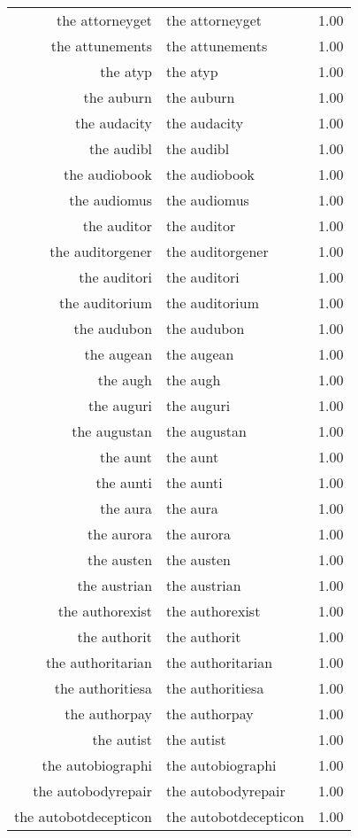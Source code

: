 \begin{table}[ht]
\begin{tabular}{rlr}
  the attorneyget & the attorneyget & 1.00 \\ 
  the attunements & the attunements & 1.00 \\ 
  the atyp & the atyp & 1.00 \\ 
  the auburn & the auburn & 1.00 \\ 
  the audacity & the audacity & 1.00 \\ 
  the audibl & the audibl & 1.00 \\ 
  the audiobook & the audiobook & 1.00 \\ 
  the audiomus & the audiomus & 1.00 \\ 
  the auditor & the auditor & 1.00 \\ 
  the auditorgener & the auditorgener & 1.00 \\ 
  the auditori & the auditori & 1.00 \\ 
  the auditorium & the auditorium & 1.00 \\ 
  the audubon & the audubon & 1.00 \\ 
  the augean & the augean & 1.00 \\ 
  the augh & the augh & 1.00 \\ 
  the auguri & the auguri & 1.00 \\ 
  the augustan & the augustan & 1.00 \\ 
  the aunt & the aunt & 1.00 \\ 
  the aunti & the aunti & 1.00 \\ 
  the aura & the aura & 1.00 \\ 
  the aurora & the aurora & 1.00 \\ 
  the austen & the austen & 1.00 \\ 
  the austrian & the austrian & 1.00 \\ 
  the authorexist & the authorexist & 1.00 \\ 
  the authorit & the authorit & 1.00 \\ 
  the authoritarian & the authoritarian & 1.00 \\ 
  the authoritiesa & the authoritiesa & 1.00 \\ 
  the authorpay & the authorpay & 1.00 \\ 
  the autist & the autist & 1.00 \\ 
  the autobiographi & the autobiographi & 1.00 \\ 
  the autobodyrepair & the autobodyrepair & 1.00 \\ 
  the autobotdecepticon & the autobotdecepticon & 1.00 \\ 

\end{tabular}
\end{table}
